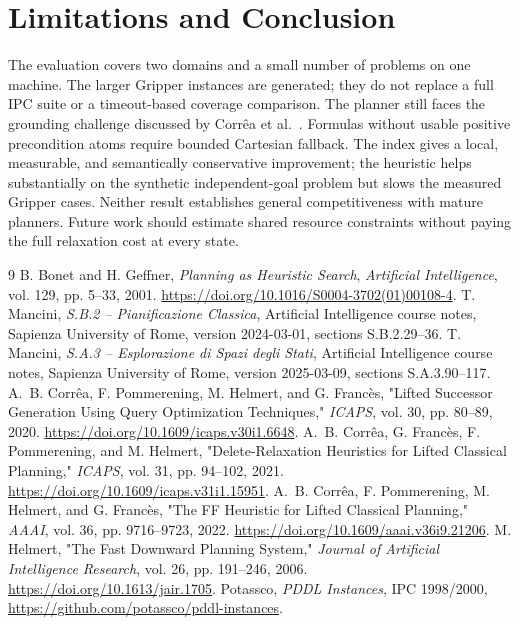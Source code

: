 \documentclass[10pt,a4paper]{article}
\begin{document}
\section{Limitations and Conclusion}
The evaluation covers two domains and a small number of problems on one
machine. The larger Gripper instances are generated; they do not replace a full
IPC suite or a timeout-based coverage comparison. The planner still faces the
grounding challenge discussed by Corr\^ea et al.~\cite{correa2020}. Formulas
without usable positive precondition atoms require bounded Cartesian fallback.
The index gives a local, measurable, and semantically conservative improvement;
the heuristic helps substantially on the synthetic independent-goal problem
but slows the measured Gripper cases. Neither result establishes general
competitiveness with mature planners. Future work should estimate shared
resource constraints without paying the full relaxation cost at every state.


\small
\begin{thebibliography}{9}
B. Bonet and H. Geffner, \emph{Planning as Heuristic Search},
\emph{Artificial Intelligence}, vol. 129, pp. 5--33, 2001.
\url{https://doi.org/10.1016/S0004-3702(01)00108-4}.
T. Mancini, \emph{S.B.2 -- Pianificazione Classica},
Artificial Intelligence course notes, Sapienza University of Rome,
version 2024-03-01, sections S.B.2.29--36.
T. Mancini, \emph{S.A.3 -- Esplorazione di Spazi degli Stati},
Artificial Intelligence course notes, Sapienza University of Rome,
version 2025-03-09, sections S.A.3.90--117.
A.~B. Corr\^ea, F. Pommerening, M. Helmert, and G. Franc\`es,
"Lifted Successor Generation Using Query Optimization Techniques,"
\emph{ICAPS}, vol. 30, pp. 80--89, 2020.
\url{https://doi.org/10.1609/icaps.v30i1.6648}.
A.~B. Corr\^ea, G. Franc\`es, F. Pommerening, and M. Helmert,
"Delete-Relaxation Heuristics for Lifted Classical Planning,"
\emph{ICAPS}, vol. 31, pp. 94--102, 2021.
\url{https://doi.org/10.1609/icaps.v31i1.15951}.
A.~B. Corr\^ea, F. Pommerening, M. Helmert, and G. Franc\`es,
"The FF Heuristic for Lifted Classical Planning,"
\emph{AAAI}, vol. 36, pp. 9716--9723, 2022.
\url{https://doi.org/10.1609/aaai.v36i9.21206}.
M. Helmert, "The Fast Downward Planning System,"
\emph{Journal of Artificial Intelligence Research}, vol. 26,
pp. 191--246, 2006. \url{https://doi.org/10.1613/jair.1705}.
Potassco, \emph{PDDL Instances}, IPC 1998/2000,
\url{https://github.com/potassco/pddl-instances}.
\end{thebibliography}
\normalsize
\end{document}
